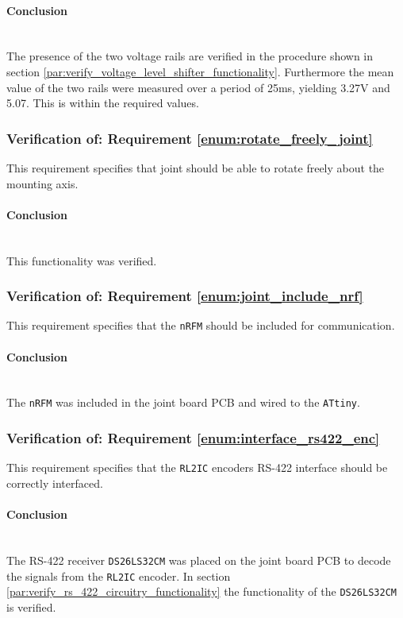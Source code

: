 \paragraph{Conclusion}~\\
The presence of the two voltage rails are verified in the procedure shown in section \ref{par:verify_voltage_level_shifter_functionality}.
Furthermore the mean value of the two rails were measured over a period of 25ms, yielding 3.27V and 5.07.
This is within the required values.

\subsubsection{Verification of: Requirement \ref{enum:rotate_freely_joint}} %
\label{ssub:verification_of_requirement_enum:rotate_freely_joint}
This requirement specifies that joint should be able to rotate freely about the mounting axis.

\paragraph{Conclusion}~\\
This functionality was verified.


\subsubsection{Verification of: Requirement \ref{enum:joint_include_nrf}} %
\label{ssub:verification_of_requirement_enum:joint_include_nrf}
This requirement specifies that the \texttt{nRFM} should be included for communication.

\paragraph{Conclusion}~\\
The \texttt{nRFM} was included in the joint board PCB and wired to the \texttt{ATtiny}.

\subsubsection{Verification of: Requirement \ref{enum:interface_rs422_enc}} %
\label{ssub:verification_of_requirement_enum:interface_rs422_enc}
This requirement specifies that the \texttt{RL2IC} encoders RS-422 interface should be correctly interfaced.

\paragraph{Conclusion}~\\
The RS-422 receiver \texttt{DS26LS32CM} was placed on the joint board PCB to decode the signals from the \texttt{RL2IC} encoder.
In section \ref{par:verify_rs_422_circuitry_functionality} the functionality of the \texttt{DS26LS32CM} is verified. 

